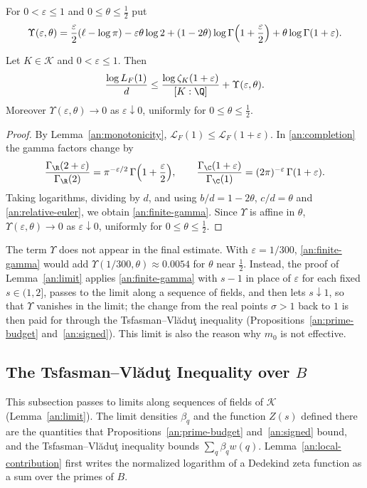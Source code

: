 For $0<\varepsilon\le1$ and $0\le\theta\le\frac12$ put
\begin{equation}\label{an:gamma}
 \Upsilon(\varepsilon,\theta)
 =\frac\varepsilon2(\ell-\log\pi)-\varepsilon\theta\log2
 +(1-2\theta)\log\Gamma\Bigl(1+\frac\varepsilon2\Bigr)
 +\theta\log\Gamma(1+\varepsilon).
\end{equation}

\begin{lemma}\label{an:shift}
Let $K\in\mathcal K$ and $0<\varepsilon\le1$. Then
\begin{equation}\label{an:finite-gamma}
 \frac{\log L_F(1)}d
 \le\frac{\log\zeta_K(1+\varepsilon)}{[K:\Q]}+\Upsilon(\varepsilon,\theta).
\end{equation}
Moreover $\Upsilon(\varepsilon,\theta)\to0$ as $\varepsilon\downarrow0$,
uniformly for $0\le\theta\le\frac12$.
\end{lemma}

\begin{proof}
By Lemma~\ref{an:monotonicity},
$\mathcal L_F(1)\le\mathcal L_F(1+\varepsilon)$. In \eqref{an:completion}
the gamma factors change by
\[
 \frac{\Gamma_\R(2+\varepsilon)}{\Gamma_\R(2)}
 =\pi^{-\varepsilon/2}\,\Gamma\Bigl(1+\frac\varepsilon2\Bigr),\qquad
 \frac{\Gamma_\C(1+\varepsilon)}{\Gamma_\C(1)}
 =(2\pi)^{-\varepsilon}\,\Gamma(1+\varepsilon).
\]
Taking logarithms, dividing by $d$, and using $b/d=1-2\theta$, $c/d=\theta$
and \eqref{an:relative-euler}, we obtain \eqref{an:finite-gamma}. Since
$\Upsilon$ is affine in $\theta$, $\Upsilon(\varepsilon,\theta)\to0$ as
$\varepsilon\downarrow0$, uniformly for $0\le\theta\le\frac12$.
\end{proof}

The term $\Upsilon$ does not appear in the final estimate. With
$\varepsilon=1/300$, \eqref{an:finite-gamma} would add
$\Upsilon(1/300,\theta)\approx0.0054$ for $\theta$ near $\frac12$. Instead,
the proof of Lemma~\ref{an:limit} applies \eqref{an:finite-gamma} with $s-1$
in place of $\varepsilon$ for each fixed $s\in(1,2]$, passes to the limit
along a sequence of fields, and then lets $s\downarrow1$, so that $\Upsilon$
vanishes in the limit; the change from the real points $\sigma>1$ back to
$1$ is then paid for through the Tsfasman--Vl\u{a}du\c{t} inequality
(Propositions~\ref{an:prime-budget} and~\ref{an:signed}). This limit is
also the reason why $m_0$ is not effective.


\subsection{\texorpdfstring{The Tsfasman--Vl\u{a}du\c{t} Inequality over $B$}{The Tsfasman-Vladut Inequality over B}}
\label{an:budget-section}
This subsection passes to limits along sequences of fields of $\mathcal K$
(Lemma~\ref{an:limit}). The limit densities $\beta_q$ and the function $Z(s)$
defined there are the quantities that Propositions~\ref{an:prime-budget}
and~\ref{an:signed} bound, and the Tsfasman--Vl\u{a}du\c{t} inequality bounds
$\sum_q\beta_qw(q)$. Lemma~\ref{an:local-contribution} first writes the
normalized logarithm of a Dedekind zeta function as a sum over the primes
of $B$.

